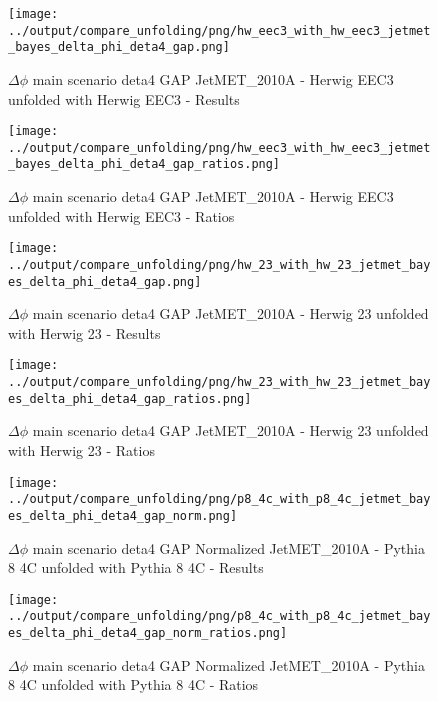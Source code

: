 \documentclass[11pt]{book}
\begin{document}
\begin{figure}[ht]
\centering
\texttt{[image: ../output/compare\_unfolding/png/hw\_eec3\_with\_hw\_eec3\_jetmet\_bayes\_delta\_phi\_deta4\_gap.png]}
\caption{$\Delta\phi$ main scenario deta4 GAP JetMET\_2010A - Herwig EEC3 unfolded with Herwig EEC3 - Results}
\label{hw_eec3_hw_eec3_jetmet_bayes_delta_phi_deta4_gap_a}
\end{figure}

\begin{figure}[ht]
\centering
\texttt{[image: ../output/compare\_unfolding/png/hw\_eec3\_with\_hw\_eec3\_jetmet\_bayes\_delta\_phi\_deta4\_gap\_ratios.png]}
\caption{$\Delta\phi$ main scenario deta4 GAP JetMET\_2010A - Herwig EEC3 unfolded with Herwig EEC3 - Ratios}
\label{hw_eec3_hw_eec3_jetmet_bayes_delta_phi_deta4_gap_b}
\end{figure}

\begin{figure}[ht]
\centering
\texttt{[image: ../output/compare\_unfolding/png/hw\_23\_with\_hw\_23\_jetmet\_bayes\_delta\_phi\_deta4\_gap.png]}
\caption{$\Delta\phi$ main scenario deta4 GAP JetMET\_2010A - Herwig 23 unfolded with Herwig 23 - Results}
\label{hw_23_hw_23_jetmet_bayes_delta_phi_deta4_gap_a}
\end{figure}

\begin{figure}[ht]
\centering
\texttt{[image: ../output/compare\_unfolding/png/hw\_23\_with\_hw\_23\_jetmet\_bayes\_delta\_phi\_deta4\_gap\_ratios.png]}
\caption{$\Delta\phi$ main scenario deta4 GAP JetMET\_2010A - Herwig 23 unfolded with Herwig 23 - Ratios}
\label{hw_23_hw_23_jetmet_bayes_delta_phi_deta4_gap_b}
\end{figure}


\begin{figure}[ht]
\centering
\texttt{[image: ../output/compare\_unfolding/png/p8\_4c\_with\_p8\_4c\_jetmet\_bayes\_delta\_phi\_deta4\_gap\_norm.png]}
\caption{$\Delta\phi$ main scenario deta4 GAP Normalized JetMET\_2010A - Pythia 8 4C unfolded with Pythia 8 4C - Results}
\label{p8_p8_jetmet_bayes_delta_phi_deta4_gap_norm_a}
\end{figure}

\begin{figure}[ht]
\centering
\texttt{[image: ../output/compare\_unfolding/png/p8\_4c\_with\_p8\_4c\_jetmet\_bayes\_delta\_phi\_deta4\_gap\_norm\_ratios.png]}
\caption{$\Delta\phi$ main scenario deta4 GAP Normalized JetMET\_2010A - Pythia 8 4C unfolded with Pythia 8 4C - Ratios}
\label{p8_p8_jetmet_bayes_delta_phi_deta4_gap_norm_b}
\end{figure}
\end{document}
